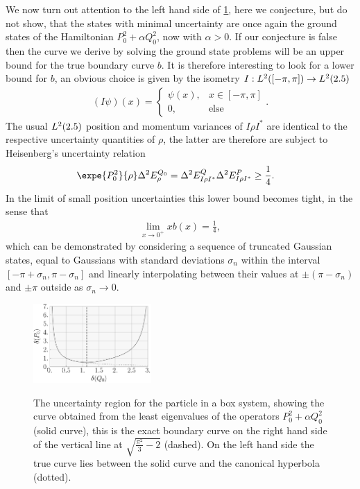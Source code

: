 We now turn out attention to the left hand side of \ref{fig:box-ur}, here we conjecture, but do not show, that the states with minimal uncertainty are once again the ground states of the Hamiltonian $P_0^2 + \alpha Q_0^2$, now with $\alpha >0$. If our conjecture is false then the curve we derive by solving the ground state problems will be an upper bound for the true boundary curve $b$. It is therefore interesting to look for a lower bound for $b$, an obvious choice is given by the isometry $I:L^2([-\pi,\pi])\to L^2(2.5)$
\begin{align}
  (I\psi)(x) = \begin{cases}\psi(x),&x\in [-\pi,\pi]\\ 0, &\text{else}\end{cases}.
\end{align}
The usual $L^2(2.5)$ position and momentum variances of $I\rho I^{*}$ are identical to the respective uncertainty quantities of $\rho$, the latter are therefore are subject to Heisenberg's  uncertainty relation
\begin{align}
  \expe{P_0^2}{\rho} \var{E^{Q_0}_{\rho}} &= \var{E^{Q}_{I\rho I^{*}}} \var{E^{P}_{I\rho I^{*}}} \geq \frac{1}{4}.
\end{align}
In the limit of small position uncertainties this lower bound becomes tight, in the sense that
\begin{align}
  \lim_{x\to 0^{+}} x b(x) = \frac{1}{4},
\end{align}
which can be demonstrated by considering a sequence of truncated Gaussian states, equal to Gaussians with standard deviations $\sigma_n$ within the interval $[-\pi+\sigma_n, \pi-\sigma_n]$ and linearly interpolating between their values at $\pm (\pi-\sigma_n)$ and $\pm \pi$ outside as $\sigma_n \to 0$.

\begin{figure}
  \includegraphics[width=0.4\textwidth]{box-ur}
  \label{fig:box-ur}
  \caption{The uncertainty region for the particle in a box system, showing the curve obtained from the least eigenvalues of the operators $P_0^2 + \alpha Q_0^2$ (solid curve), this is the exact boundary curve on the right hand side of the vertical line at $\sqrt{\frac{\pi^2}{3} -2}$ (dashed). On the left hand side the true curve lies between the solid curve and the canonical hyperbola (dotted). }
\end{figure}

